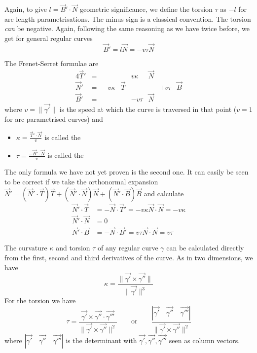 Again, to give $l = \vec{B}'\cdot \vec{N}$ geometric significance, we define the torsion $\tau$ as $-l$ for arc length parametrisations. The minus sign is a classical convention. The torsion \textit{can} be negative. Again, following the same reasoning as we have twice before, we get for general regular curves
\[ \vec{B}' = l \vec{N} = - v \tau \vec{N} \]

\begin{eigenschap}
The Frenet-Serret formulae are
\begin{alignat*}{4}
\vec{T}' &= & & & v\kappa&\vec{N} & & \\
\vec{N}' &= & -v\kappa&\vec{T} & & & +v\tau&\vec{B} \\
\vec{B}' &= & & & -v\tau&\vec{N} & &
\end{alignat*}
where $v = \lVert \vec{\gamma'} \lVert$ is the speed at which the curve is traversed in that point ($v=1$ for arc parametrised curves) and
\begin{itemize}
\item $\kappa = \frac{\vec{T}'\cdot \vec{N}}{v}$ is called the 
\item $\tau = \frac{- \vec{B}'\cdot \vec{N}}{v}$ is called the 
\end{itemize}
\end{eigenschap}
The only formula we have not yet proven is the second one. It can easily be seen to be correct if we take the orthonormal expansion $\vec{N}' = (\vec{N}'\cdot \vec{T})\vec{T} + (\vec{N}'\cdot \vec{N})\vec{N} + (\vec{N}'\cdot \vec{B})\vec{B}$ and calculate
\begin{align*}
\vec{N}'\cdot \vec{T} &= - \vec{N}\cdot \vec{T}' = -v\kappa \vec{N}\cdot \vec{N} = -v\kappa \\
\vec{N}'\cdot \vec{N} &= 0 \\
\vec{N}'\cdot \vec{B} &= - \vec{N}\cdot \vec{B}' = v\tau \vec{N}\cdot \vec{N} = v\tau
\end{align*}

The curvature $\kappa$ and torsion $\tau$ of any regular curve $\gamma$ can be calculated directly from the first, second and third derivatives of the curve. As in two dimensions, we have
\[ \kappa = \frac{\lVert \vec{\gamma'} \times \vec{\gamma''}\lVert}{\lVert\vec{\gamma'}\lVert^3} \]
For the torsion we have
\[ \tau = \frac{\vec{\gamma'}\times\vec{\gamma''}\cdot\vec{\gamma'''}}{\lVert\vec{\gamma'}\times\vec{\gamma''}\lVert^2} \qquad \text{or}\qquad \frac{|\vec{\gamma'}\quad\vec{\gamma''}\quad\vec{\gamma'''}|}{\lVert\vec{\gamma'}\times\vec{\gamma''}\lVert^2} \]
where $| \vec{\gamma'} \quad \vec{\gamma''}\quad \vec{\gamma'''}|$ is the determinant with $\vec{\gamma'},\vec{\gamma''}, \vec{\gamma'''}$ seen as column vectors.

